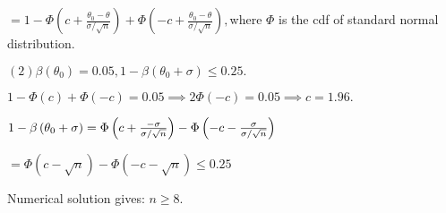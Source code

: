 \documentclass{article}
\begin{document}
$=1-\Phi \left( c+\frac{\theta _{0}-\theta }{\sigma /\sqrt{n}}\right) +\Phi
\left( -c+\frac{\theta _{0}-\theta }{\sigma /\sqrt{n}}\right) ,$where $\Phi $
is the cdf of standard normal distribution.

$\left( 2\right) \beta \left( \theta _{0}\right) =0.05,1-\beta \left( \theta
_{0}+\sigma \right) \leq 0.25.$

$1-\Phi \left( c\right) +\Phi \left( -c\right) =0.05\implies 2\Phi \left(
-c\right) =0.05\implies c=1.96.$

$1-\beta \left( \theta _{0}+\sigma \right) =\Phi \left( c+\frac{-\sigma }{%
\sigma /\sqrt{n}}\right) -\Phi \left( -c-\frac{\sigma }{\sigma /\sqrt{n}}%
\right) $

$=\Phi \left( c-\sqrt{n}\right) -\Phi \left( -c-\sqrt{n}\right) \leq 0.25$

Numerical solution gives: $n\geq 8.$
\end{document}
